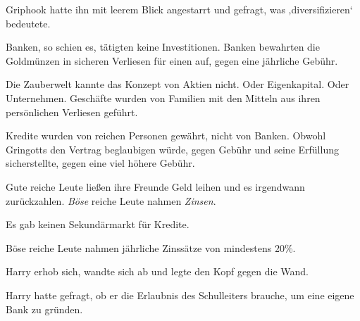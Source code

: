 Griphook hatte ihn mit leerem Blick angestarrt und gefragt, was ‚diversifizieren‘ bedeutete.

Banken, so schien es, tätigten keine Investitionen. Banken bewahrten die Goldmünzen in sicheren Verliesen für einen auf, gegen eine jährliche Gebühr.

Die Zauberwelt kannte das Konzept von Aktien nicht. Oder Eigenkapital. Oder Unternehmen. Geschäfte wurden von Familien mit den Mitteln aus ihren persönlichen Verliesen geführt.

Kredite wurden von reichen Personen gewährt, nicht von Banken. Obwohl Gringotts den Vertrag beglaubigen würde, gegen Gebühr und seine Erfüllung sicherstellte, gegen eine viel höhere Gebühr.

Gute reiche Leute ließen ihre Freunde Geld leihen und es irgendwann zurückzahlen. \emph{Böse} reiche Leute nahmen \emph{Zinsen}.

Es gab keinen Sekundärmarkt für Kredite.

Böse reiche Leute nahmen jährliche Zinssätze von mindestens 20\%.

Harry erhob sich, wandte sich ab und legte den Kopf gegen die Wand.

Harry hatte gefragt, ob er die Erlaubnis des Schulleiters brauche, um eine eigene Bank zu gründen.

